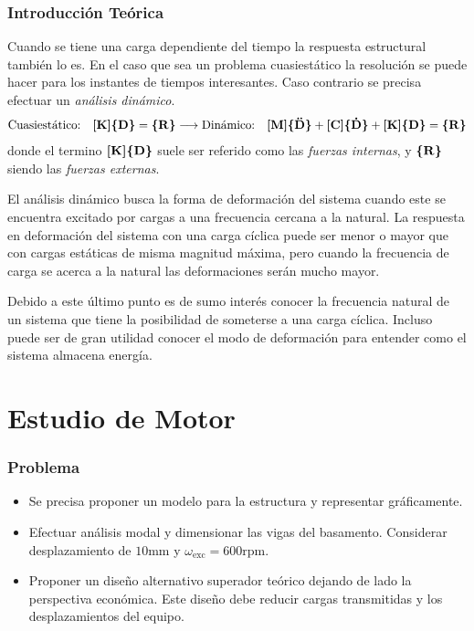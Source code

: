 \documentclass[onecolumn,10pt,titlepage,a4paper]{article}
\begin{document}
\setcounter{section}{-1}

\tableofcontents

\section{Introducción Teórica}
Cuando se tiene una carga dependiente del tiempo la respuesta estructural también lo es. En el caso que sea un problema cuasiestático la resolución se puede hacer para los instantes de tiempos interesantes. Caso contrario se precisa efectuar un \textit{análisis dinámico}.
\[
\text{Cuasiestático:}\quad \boldsymbol{[}\mathbf{K} \boldsymbol{]}\boldsymbol{\{ }\mathbf{D} \boldsymbol{\}} = \boldsymbol{\{ }\mathbf{R} \boldsymbol{\}} \longrightarrow \text{Dinámico:} \quad 
\boldsymbol{[}\mathbf{M} \boldsymbol{]} \boldsymbol{\{ }\mathbf{\ddot{D}} \boldsymbol{\}} + \boldsymbol{[}\mathbf{C} \boldsymbol{]}\boldsymbol{\{ }\mathbf{\dot{D}} \boldsymbol{\}} + \boldsymbol{[}\mathbf{K} \boldsymbol{]}\boldsymbol{\{ }\mathbf{D} \boldsymbol{\}} = \boldsymbol{\{ }\mathbf{R} \boldsymbol{\}}	
\]
donde el termino $\boldsymbol{[}\mathbf{K} \boldsymbol{]}\boldsymbol{\{ }\mathbf{D} \boldsymbol{\}}$ suele ser referido como las \textit{fuerzas internas}, y $\boldsymbol{\{ }\mathbf{R} \boldsymbol{\}}$ siendo las \textit{fuerzas externas}.

El análisis dinámico busca la forma de deformación del sistema cuando este se encuentra excitado por cargas a una frecuencia cercana a la natural. La respuesta en deformación del sistema con una carga cíclica puede ser menor o mayor que con cargas estáticas de misma magnitud máxima, pero cuando la frecuencia de carga se acerca a la natural las deformaciones serán mucho mayor. 

Debido a este último punto es de sumo interés conocer la frecuencia natural de un sistema que tiene la posibilidad de someterse a una carga cíclica. Incluso puede ser de gran utilidad conocer el modo de deformación para entender como el sistema almacena energía.


\part{Estudio de Motor}
\setcounter{section}{0}
\section{Problema}

\begin{itemize}
	\item Se precisa proponer un modelo para la estructura y representar gráficamente.
	\item Efectuar análisis modal y dimensionar las vigas del basamento. Considerar desplazamiento de $10$mm y $\omega_{\mathrm{exc}}=600\mathrm{rpm}$.
	\item Proponer un diseño alternativo superador teórico dejando de lado la perspectiva económica. Este diseño debe reducir cargas transmitidas y los desplazamientos del equipo.
\end{itemize}
\end{document}
